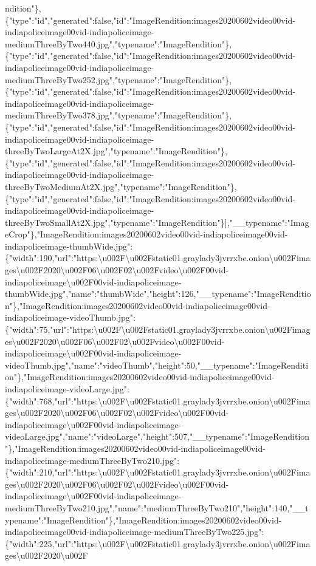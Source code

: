 ndition"\},\{"type":"id","generated":false,"id":"ImageRendition:images20200602video00vid-indiapoliceimage00vid-indiapoliceimage-mediumThreeByTwo440.jpg","typename":"ImageRendition"\},\{"type":"id","generated":false,"id":"ImageRendition:images20200602video00vid-indiapoliceimage00vid-indiapoliceimage-mediumThreeByTwo252.jpg","typename":"ImageRendition"\},\{"type":"id","generated":false,"id":"ImageRendition:images20200602video00vid-indiapoliceimage00vid-indiapoliceimage-mediumThreeByTwo378.jpg","typename":"ImageRendition"\},\{"type":"id","generated":false,"id":"ImageRendition:images20200602video00vid-indiapoliceimage00vid-indiapoliceimage-threeByTwoLargeAt2X.jpg","typename":"ImageRendition"\},\{"type":"id","generated":false,"id":"ImageRendition:images20200602video00vid-indiapoliceimage00vid-indiapoliceimage-threeByTwoMediumAt2X.jpg","typename":"ImageRendition"\},\{"type":"id","generated":false,"id":"ImageRendition:images20200602video00vid-indiapoliceimage00vid-indiapoliceimage-threeByTwoSmallAt2X.jpg","typename":"ImageRendition"\}{]},"\_\_typename":"ImageCrop"\},"ImageRendition:images20200602video00vid-indiapoliceimage00vid-indiapoliceimage-thumbWide.jpg":\{"width":190,"url":"https:\textbackslash{}u002F\textbackslash{}u002Fstatic01.graylady3jvrrxbe.onion\textbackslash{}u002Fimages\textbackslash{}u002F2020\textbackslash{}u002F06\textbackslash{}u002F02\textbackslash{}u002Fvideo\textbackslash{}u002F00vid-indiapoliceimage\textbackslash{}u002F00vid-indiapoliceimage-thumbWide.jpg","name":"thumbWide","height":126,"\_\_typename":"ImageRendition"\},"ImageRendition:images20200602video00vid-indiapoliceimage00vid-indiapoliceimage-videoThumb.jpg":\{"width":75,"url":"https:\textbackslash{}u002F\textbackslash{}u002Fstatic01.graylady3jvrrxbe.onion\textbackslash{}u002Fimages\textbackslash{}u002F2020\textbackslash{}u002F06\textbackslash{}u002F02\textbackslash{}u002Fvideo\textbackslash{}u002F00vid-indiapoliceimage\textbackslash{}u002F00vid-indiapoliceimage-videoThumb.jpg","name":"videoThumb","height":50,"\_\_typename":"ImageRendition"\},"ImageRendition:images20200602video00vid-indiapoliceimage00vid-indiapoliceimage-videoLarge.jpg":\{"width":768,"url":"https:\textbackslash{}u002F\textbackslash{}u002Fstatic01.graylady3jvrrxbe.onion\textbackslash{}u002Fimages\textbackslash{}u002F2020\textbackslash{}u002F06\textbackslash{}u002F02\textbackslash{}u002Fvideo\textbackslash{}u002F00vid-indiapoliceimage\textbackslash{}u002F00vid-indiapoliceimage-videoLarge.jpg","name":"videoLarge","height":507,"\_\_typename":"ImageRendition"\},"ImageRendition:images20200602video00vid-indiapoliceimage00vid-indiapoliceimage-mediumThreeByTwo210.jpg":\{"width":210,"url":"https:\textbackslash{}u002F\textbackslash{}u002Fstatic01.graylady3jvrrxbe.onion\textbackslash{}u002Fimages\textbackslash{}u002F2020\textbackslash{}u002F06\textbackslash{}u002F02\textbackslash{}u002Fvideo\textbackslash{}u002F00vid-indiapoliceimage\textbackslash{}u002F00vid-indiapoliceimage-mediumThreeByTwo210.jpg","name":"mediumThreeByTwo210","height":140,"\_\_typename":"ImageRendition"\},"ImageRendition:images20200602video00vid-indiapoliceimage00vid-indiapoliceimage-mediumThreeByTwo225.jpg":\{"width":225,"url":"https:\textbackslash{}u002F\textbackslash{}u002Fstatic01.graylady3jvrrxbe.onion\textbackslash{}u002Fimages\textbackslash{}u002F2020\textbackslash{}u002F